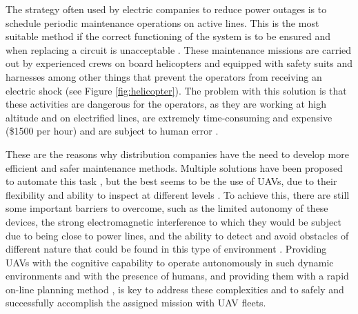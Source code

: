 The strategy often used by electric companies to reduce power outages is to schedule periodic maintenance operations on active lines. This is the most suitable method if the correct functioning of the system is to be ensured and when replacing a circuit is unacceptable \cite{PowerOutagesCauses}. These maintenance missions are carried out by experienced crews on board helicopters and equipped with safety suits and harnesses among other things that prevent the operators from receiving an electric shock (see Figure \ref{fig:helicopter}). The problem with this solution is that these activities are dangerous for the operators, as they are working at high altitude and on electrified lines, are extremely time-consuming and expensive (\$1500 per hour) and are subject to human error \cite{MaintenanceCost}.

These are the reasons why distribution companies have the need to develop more efficient and safer maintenance methods. Multiple solutions have been proposed to automate this task \cite{MaintenanceSolutions}, but the best seems to be the use of \glspl{UAV}, due to their flexibility and ability to inspect at different levels \cite{PowerOutagesCauses}. To achieve this, there are still some important barriers to overcome, such as the limited autonomy of these devices, the strong electromagnetic interference to which they would be subject due to being close to power lines, and the ability to detect and avoid obstacles of different nature that could be found in this type of environment \cite{MaintenanceCost}. Providing \glspl{UAV} with the cognitive capability to operate autonomously in such dynamic environments and with the presence of humans, and providing them with a rapid on-line planning method \cite{FastOnlinePlanning}, is key to address these complexities and to safely and successfully accomplish the assigned mission with \gls{UAV} fleets.

